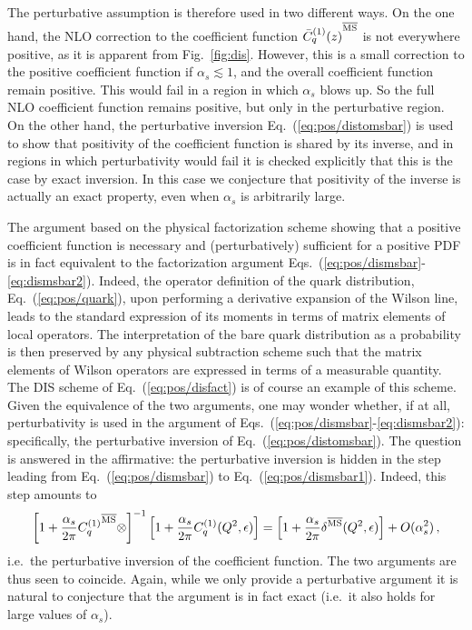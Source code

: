 The perturbative  assumption is therefore used in two different
ways. On the one hand, the NLO correction to the \msbar{}  coefficient function
 ${\bar  C^{(1)}_q(z)}^{{\overline{\textrm{MS}}}}$ is not everywhere positive, as it is
apparent from Fig.~\ref{fig:dis}. However, this is a small correction
to the positive coefficient function if $\alpha_s\lesssim 1$, and the
overall coefficient function remain positive. This would fail in a
region in which $\alpha_s$ blows up. So the full NLO coefficient
function remains positive, but only in the perturbative region. On the other
hand, the perturbative inversion Eq.~(\ref{eq:pos/distomsbar}) is used to
show that positivity of the coefficient function is shared by its
inverse, and in regions in which perturbativity would fail it is
checked explicitly that this is the case by exact inversion. In this
case we conjecture that positivity of the inverse is actually an exact
property, even when $\alpha_s$ is arbitrarily large.

The argument based on the physical factorization scheme showing that
a positive coefficient function is necessary and (perturbatively)
sufficient for a positive PDF is in fact equivalent to the
factorization argument
Eqs.~(\ref{eq:pos/dismsbar}-\ref{eq:dismsbar2}). Indeed, 
the operator definition of the quark distribution, Eq.~(\ref{eq:pos/quark}),
upon performing a derivative expansion of the Wilson line, leads to
the standard expression of its moments in terms of matrix elements of
local operators. The interpretation of the bare quark distribution as
a probability  is then
preserved by any physical subtraction scheme such that the matrix
elements of Wilson operators are expressed in terms of a measurable
quantity. The DIS scheme of Eq.~(\ref{eq:pos/disfact}) is of course an
example of this scheme. Given the equivalence of the two arguments,
one may wonder whether, if at all, perturbativity is used in the
argument of Eqs.~(\ref{eq:pos/dismsbar}-\ref{eq:dismsbar2}): specifically,
the perturbative inversion of Eq.~(\ref{eq:pos/distomsbar}). The question is
answered in the affirmative: the perturbative inversion is hidden in the step leading from Eq.~(\ref{eq:pos/dismsbar})
to Eq.~(\ref{eq:pos/dismsbar1}). Indeed, this step amounts to 
\begin{equation}\label{eq:pos/exinv}
\left[1
  +\frac{\alpha_s}{2\pi} {C_{q}^{(1)}}^{{\overline{\textrm{MS}}}}\otimes\right]^{-1} \left[1
    +\frac{\alpha_s}{2\pi} C_{q}^{(1)}(Q^2,\epsilon)\right]=
\left[1
    +\frac{\alpha_s}{2\pi} \delta^{{\overline{\textrm{MS}}}} (Q^2,\epsilon)\right]
+O(\alpha_s^2) \,,
\end{equation}
i.e.\ the perturbative inversion of the \msbar{} coefficient function. 
The two arguments are thus seen
to coincide. Again, while we only provide a perturbative argument it
is natural to conjecture that the argument is in fact exact (i.e.\ it
also holds for large values of $\alpha_s$).
 


